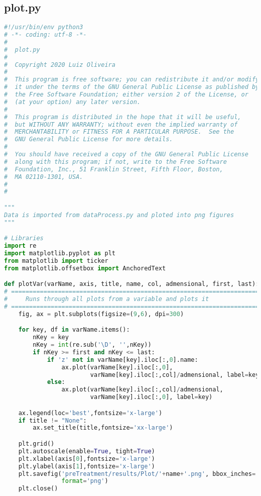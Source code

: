 \subsection{plot.py}
\begin{lstlisting}[language=python]
#!/usr/bin/env python3
# -*- coding: utf-8 -*-
#
#  plot.py
#  
#  Copyright 2020 Luiz Oliveira
#  
#  This program is free software; you can redistribute it and/or modify
#  it under the terms of the GNU General Public License as published by
#  the Free Software Foundation; either version 2 of the License, or
#  (at your option) any later version.
#  
#  This program is distributed in the hope that it will be useful,
#  but WITHOUT ANY WARRANTY; without even the implied warranty of
#  MERCHANTABILITY or FITNESS FOR A PARTICULAR PURPOSE.  See the
#  GNU General Public License for more details.
#  
#  You should have received a copy of the GNU General Public License
#  along with this program; if not, write to the Free Software
#  Foundation, Inc., 51 Franklin Street, Fifth Floor, Boston,
#  MA 02110-1301, USA.
#  
#  

"""
Data is imported from dataProcess.py and ploted into png figures
"""

# Libraries
import re
import matplotlib.pyplot as plt
from matplotlib import ticker
from matplotlib.offsetbox import AnchoredText

def plotVar(varName, axis, title, name, col, admensional, first, last):
# =============================================================================
#     Runs through all plots from a variable and plots it
# =============================================================================
    fig, ax = plt.subplots(figsize=(9,6), dpi=300)

    for key, df in varName.items():
        nKey = key
        nKey = int(re.sub('\D', '',nKey))
        if nKey >= first and nKey <= last:
            if 'z' not in varName[key].iloc[:,0].name:
                ax.plot(varName[key].iloc[:,0],
                        varName[key].iloc[:,col]/admensional, label=key)
            else:
                ax.plot(varName[key].iloc[:,col]/admensional,
                        varName[key].iloc[:,0], label=key)

    ax.legend(loc='best',fontsize='x-large')
    if title != "None":
        ax.set_title(title,fontsize='xx-large')

    plt.grid()
    plt.autoscale(enable=True, tight=True)
    plt.xlabel(axis[0],fontsize='x-large')
    plt.ylabel(axis[1],fontsize='x-large')
    plt.savefig('preTreatment/results/Plot/'+name+'.png', bbox_inches='tight',
                format='png')
    plt.close()


\end{lstlisting}
